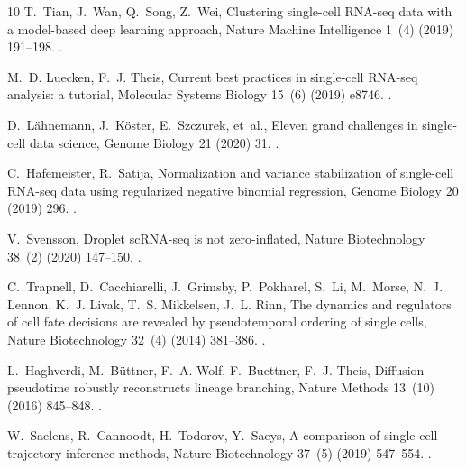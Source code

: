 \documentclass[preprint,12pt]{elsarticle}
\begin{document}
\begin{thebibliography}{10}
T.~Tian, J.~Wan, Q.~Song, Z.~Wei, Clustering single-cell {RNA-seq} data with a
  model-based deep learning approach, Nature Machine Intelligence 1~(4) (2019)
  191--198.
\newblock \href {https://doi.org/10.1038/s42256-019-0037-0}
  {}.

M.~D. Luecken, F.~J. Theis, Current best practices in single-cell
  {RNA-seq} analysis: a tutorial, Molecular Systems Biology 15~(6) (2019)
  e8746.
\newblock \href {https://doi.org/10.15252/msb.20188746}
  {}.

D.~L{\"a}hnemann, J.~K{\"o}ster, E.~Szczurek, et~al.,
  Eleven grand challenges in single-cell data science,
  Genome Biology 21 (2020) 31.
\newblock \href {https://doi.org/10.1186/s13059-020-1926-6}
  {}.

C.~Hafemeister, R.~Satija, Normalization and variance stabilization of
  single-cell {RNA-seq} data using regularized negative binomial regression,
  Genome Biology 20 (2019) 296.
\newblock \href {https://doi.org/10.1186/s13059-019-1874-1}
  {}.

V.~Svensson, Droplet scRNA-seq is not zero-inflated,
  Nature Biotechnology 38~(2) (2020) 147--150.
\newblock \href {https://doi.org/10.1038/s41587-019-0379-5}
  {}.

C.~Trapnell, D.~Cacchiarelli, J.~Grimsby, P.~Pokharel, S.~Li, M.~Morse,
  N.~J. Lennon, K.~J. Livak, T.~S. Mikkelsen, J.~L. Rinn,
  The dynamics and regulators of cell fate decisions are revealed by
  pseudotemporal ordering of single cells,
  Nature Biotechnology 32~(4) (2014) 381--386.
\newblock \href {https://doi.org/10.1038/nbt.2859}
  {}.

L.~Haghverdi, M.~B{\"u}ttner, F.~A. Wolf, F.~Buettner, F.~J. Theis,
  Diffusion pseudotime robustly reconstructs lineage branching,
  Nature Methods 13~(10) (2016) 845--848.
\newblock \href {https://doi.org/10.1038/nmeth.3971}
  {}.

W.~Saelens, R.~Cannoodt, H.~Todorov, Y.~Saeys,
  A comparison of single-cell trajectory inference methods,
  Nature Biotechnology 37~(5) (2019) 547--554.
\newblock \href {https://doi.org/10.1038/s41587-019-0071-9}
  {}.


\end{thebibliography}
\end{document}
